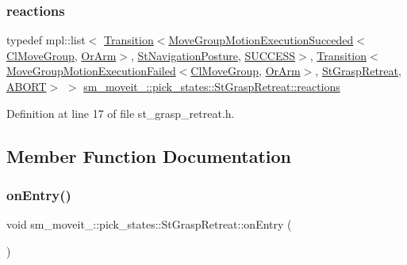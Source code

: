 \subsubsection{\texorpdfstring{reactions}{reactions}}
{\footnotesize\ttfamily typedef mpl\+::list$<$ \hyperlink{classsmacc_1_1Transition}{Transition}$<$\hyperlink{structmoveit__z__client_1_1MoveGroupMotionExecutionSucceded}{Move\+Group\+Motion\+Execution\+Succeded}$<$\hyperlink{classmoveit__z__client_1_1ClMoveGroup}{Cl\+Move\+Group}, \hyperlink{classsm__moveit__4_1_1OrArm}{Or\+Arm}$>$, \hyperlink{structsm__moveit__4_1_1pick__states_1_1StNavigationPosture}{St\+Navigation\+Posture}, \hyperlink{structsmacc_1_1default__transition__tags_1_1SUCCESS}{S\+U\+C\+C\+E\+SS}$>$, \hyperlink{classsmacc_1_1Transition}{Transition}$<$\hyperlink{structmoveit__z__client_1_1MoveGroupMotionExecutionFailed}{Move\+Group\+Motion\+Execution\+Failed}$<$\hyperlink{classmoveit__z__client_1_1ClMoveGroup}{Cl\+Move\+Group}, \hyperlink{classsm__moveit__4_1_1OrArm}{Or\+Arm}$>$, \hyperlink{structsm__moveit__4_1_1pick__states_1_1StGraspRetreat}{St\+Grasp\+Retreat}, \hyperlink{structsmacc_1_1default__transition__tags_1_1ABORT}{A\+B\+O\+RT}$>$ $>$ \hyperlink{structsm__moveit__4_1_1pick__states_1_1StGraspRetreat_a4f5f191fa9aeaa24fd24043f983f43a8}{sm\+\_\+moveit\+\_\+::pick\+\_\+states\+::\+St\+Grasp\+Retreat\+::reactions}}



Definition at line 17 of file st\+\_\+grasp\+\_\+retreat.\+h.



\subsection{Member Function Documentation}
\mbox{\label{structsm__moveit__4_1_1pick__states_1_1StGraspRetreat_a72c11fb9d9c2a1180314e03b436334d7}} 
\subsubsection{\texorpdfstring{on\+Entry()}{onEntry()}}
{\footnotesize\ttfamily void sm\+\_\+moveit\+\_\+::pick\+\_\+states\+::\+St\+Grasp\+Retreat\+::on\+Entry (\begin{DoxyParamCaption}{ }\end{DoxyParamCaption})\hspace{0.3cm}{\ttfamily [inline]}}



